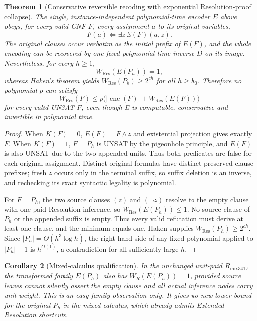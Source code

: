 \documentclass[11pt]{article}
\newtheorem{theorem}{Theorem}
\newtheorem{corollary}[theorem]{Corollary}
\begin{document}
\begin{theorem}[Conservative reversible recoding with exponential Resolution-proof collapse]\label{th:trap}
The single, instance-independent polynomial-time encoder $E$ above obeys, for every valid CNF $F$, every assignment $a$ to its original variables,
\[
 F(a)\iff \exists z\,E(F)(a,z).
\]
The original clauses occur verbatim as the initial prefix of $E(F)$, and the whole encoding can be recovered by one fixed polynomial-time inverse $D$ on its image. Nevertheless, for every $h\ge1$,
\[
 W_{\mathrm{Res}}(E(P_h))=1,
\]
whereas Haken's theorem yields $W_{\mathrm{Res}}(P_h)\ge2^{ch}$ for all $h\ge h_0$. Therefore no polynomial $p$ can satisfy
\[
 W_{\mathrm{Res}}(F)\le
 p\bigl(|\operatorname{enc}(F)|+W_{\mathrm{Res}}(E(F))\bigr)
\]
for every valid UNSAT $F$, even though $E$ is computable, conservative and invertible in polynomial time.
\end{theorem}
\begin{proof}
When $K(F)=0$, $E(F)=F\land z$ and existential projection gives exactly $F$. When $K(F)=1$, $F=P_h$ is UNSAT by the pigeonhole principle, and $E(F)$ is also UNSAT due to the two appended units. Thus both predicates are false for each original assignment. Distinct original formulas have distinct preserved clause prefixes; fresh $z$ occurs only in the terminal suffix, so suffix deletion is an inverse, and rechecking its exact syntactic legality is polynomial.

For $F=P_h$, the two source clauses $(z)$ and $(\neg z)$ resolve to the empty clause with one paid Resolution inference, so $W_{\mathrm{Res}}(E(P_h))\le1$. No source clause of $P_h$ or the appended suffix is empty. Thus every valid refutation must derive at least one clause, and the minimum equals one. Haken supplies $W_{\mathrm{Res}}(P_h)\ge2^{ch}$. Since $|P_h|=\Theta(h^3\log h)$, the right-hand side of any fixed polynomial applied to $|P_h|+1$ is $h^{O(1)}$, a contradiction for all sufficiently large $h$.
\end{proof}

\begin{corollary}[Mixed-calculus qualification]
In the unchanged unit-paid $R_{\mathrm{mix341}}$, the \emph{transformed} family $E(P_h)$ also has $W_R(E(P_h))=1$, provided source leaves cannot silently assert the empty clause and all actual inference nodes carry unit weight. This is an easy-family observation only. It gives no new lower bound for the \emph{original} $P_h$ in the mixed calculus, which already admits Extended Resolution shortcuts.
\end{corollary}
\end{document}
